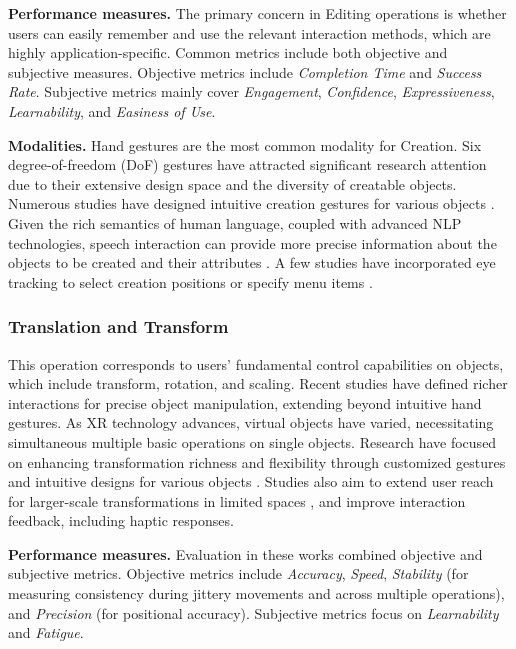 \documentclass[review]{fcs}
\begin{document}
\textbf{Performance measures.}
The primary concern in Editing operations is whether users can easily remember and use the relevant interaction methods, which are highly application-specific. Common metrics include both objective and subjective measures. Objective metrics include \textit{Completion Time} and \textit{Success Rate}. Subjective metrics mainly cover \textit{Engagement}, \textit{Confidence}, \textit{Expressiveness}, \textit{Learnability}, and \textit{Easiness of Use}.


\textbf{Modalities.}
Hand gestures are the most common modality for Creation. Six degree-of-freedom (DoF) gestures have attracted significant research attention due to their extensive design space and the diversity of creatable objects. Numerous studies have designed intuitive creation gestures for various objects \cite{DBLP:conf/chi/PeiCLZ22,DBLP:conf/ismar/ChenGFCL23,DBLP:journals/tvcg/XuZSFY23,DBLP:conf/chi/0003HLG23}. Given the rich semantics of human language, coupled with advanced NLP technologies, speech interaction can provide more precise information about the objects to be created and their attributes \cite{DBLP:conf/chi/CaoKWAX24,DBLP:conf/uist/LiaoKJKS22}. A few studies have incorporated eye tracking to select creation positions or specify menu items \cite{DBLP:conf/ismar/ChenGFCL23,10.1145/3613904.3642758,DBLP:conf/ismar/MengXL22}.




\subsubsection{Translation and Transform}
This operation corresponds to users' fundamental control capabilities on objects, which include transform, rotation, and scaling. Recent studies have defined richer interactions for precise object manipulation, extending beyond intuitive hand gestures. As XR technology advances, virtual objects have varied, necessitating simultaneous multiple basic operations on single objects. 
Research have focused on enhancing transformation richness and flexibility through customized gestures \cite{DBLP:conf/chi/CaoKWAX24,DBLP:journals/tvcg/XuZSFY23} and intuitive designs for various objects \cite{DBLP:conf/chi/PeiCLZ22,DBLP:journals/tvcg/SongDK23}. Studies also aim to extend user reach for larger-scale transformations in limited spaces \cite{DBLP:journals/ijhci/DengSZK24,DBLP:conf/chi/0003HLG23}, and improve interaction feedback, including haptic responses.


\textbf{Performance measures.}
Evaluation in these works combined objective and subjective metrics. Objective metrics include \textit{Accuracy}, \textit{Speed}, \textit{Stability} (for measuring consistency during jittery movements and across multiple operations), and \textit{Precision} (for positional accuracy). Subjective metrics focus on \textit{Learnability} and \textit{Fatigue}.
\end{document}
